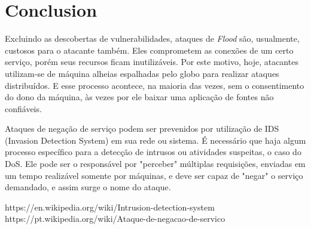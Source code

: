 \documentclass[journal]{IEEEtran}
\begin{document}





\section{Conclusion}


Excluindo as descobertas de vulnerabilidades, ataques de \textit{Flood} são, usualmente, custosos para o atacante também. Eles comprometem as conexões de um certo serviço, porém seus recursos ficam inutilizáveis. Por este motivo, hoje, atacantes utilizam-se de máquina alheias espalhadas pelo globo para realizar ataques distribuídos. E esse processo acontece, na maioria das vezes, sem o consentimento do dono da máquina, às vezes por ele baixar uma aplicação de fontes não confiáveis. \par

Ataques de negação de serviço podem ser prevenidos por utilização de IDS (Invasion Detection System) em sua rede ou sistema. É necessário que haja algum processo específico para a detecção de intrusos ou atividades suspeitas, o caso do DoS. Ele pode ser o responsável por "perceber" múltiplas requisições, enviadas em um tempo realizável somente por máquinas, e deve ser capaz de "negar" o serviço demandado, e assim surge o nome do ataque.




\begin{thebibliography}{1}

https://en.wikipedia.org/wiki/Intrusion-detection-system
https://pt.wikipedia.org/wiki/Ataque-de-negacao-de-servico

\end{thebibliography}
\end{document}
